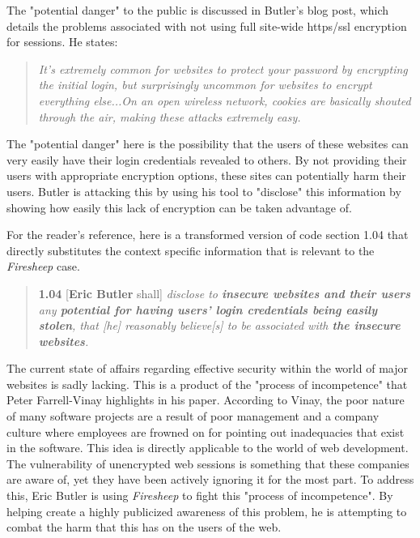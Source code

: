 \documentclass[11pt]{article}
\begin{document}
\begin{multicols}{2}
The "potential danger" to the public is discussed in Butler's blog post, which details the problems associated with not using full site-wide https/ssl encryption for sessions. He states:

\begin{quote}
  \emph{It's extremely common for websites to protect your password by encrypting the initial login, but surprisingly uncommon for websites to encrypt everything else...On an open wireless network, cookies are basically shouted through the air, making these attacks extremely easy.} \cite{codebutler_main}
\end{quote}

The "potential danger" here is the possibility that the users of these websites can very easily have their login credentials revealed to others.
By not providing their users with appropriate encryption options, these sites can potentially harm their users. Butler is attacking this by using his tool to "disclose" this information by showing how easily this lack of encryption can be taken advantage of.

For the reader's reference, here is a transformed version of code section 1.04 that directly substitutes the context specific information that is relevant to the \emph{Firesheep} case.

\begin{quote}
  \textbf{1.04} [\textbf{Eric Butler} shall] \emph{disclose to \textbf{insecure websites and their users} any \textbf{potential for having users' login credentials being easily stolen}, that [he] reasonably believe[s] to be associated with \textbf{the insecure websites}.}
\end{quote}

The current state of affairs regarding effective security within the world of major websites is sadly lacking. This is a product of the "process of incompetence" that Peter Farrell-Vinay \cite{incompetence} highlights in his paper. According to Vinay, the poor nature of many software projects are a result of poor management and a company culture where employees are frowned on for pointing out inadequacies that exist in the software. This idea is directly applicable to the world of web development. The vulnerability of unencrypted web sessions is something that these companies are aware of, yet they have been actively ignoring it for the most part. To address this, Eric Butler is using \emph{Firesheep} to fight this "process of incompetence". By helping create a highly publicized awareness of this problem, he is attempting to combat the harm that this has on the users of the web.


\end{multicols}
\end{document}
